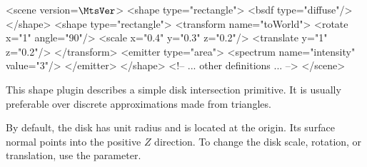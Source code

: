 \vspace{2mm}
\begin{xml}[caption={A simple example involving two rectangle instances}, label=lst:rectangle]
<scene version=$\MtsVer$>
    <shape type="rectangle">
        <bsdf type="diffuse"/>
    </shape>
    <shape type="rectangle">
        <transform name="toWorld">
            <rotate x="1" angle="90"/>
            <scale x="0.4" y="0.3" z="0.2"/>
            <translate y="1" z="0.2"/>
        </transform>
        <emitter type="area">
            <spectrum name="intensity" value="3"/>
        </emitter>
    </shape>
    <!-- ... other definitions ... -->
</scene>
\end{xml}

\vspace{-1mm}
This shape plugin describes a simple disk intersection primitive. It is
usually preferable over discrete approximations made from triangles.

By default, the disk has unit radius and is located at the origin. Its
surface normal points into the positive $Z$ direction.
To change the disk scale, rotation, or translation, use the
 parameter.

